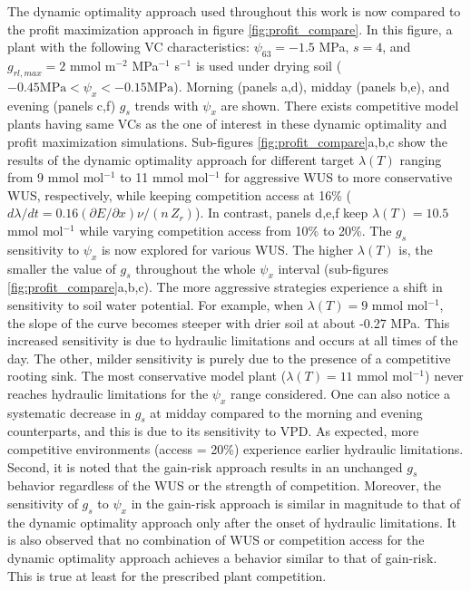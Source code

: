 \documentclass[utf8]{frontiersSCNS} %
\begin{document}
The dynamic optimality approach used throughout this work is now compared to the profit maximization approach in figure \ref{fig:profit_compare}. In this figure, a plant with the following VC characteristics: $\psi_{63} = -1.5$ MPa, $s=4$, and $g_{rl,max} = 2$ mmol m$^{-2}$ MPa$^{-1}$ s$^{-1}$ is used under drying soil ($-0.45 \text{MPa} < \psi_x < -0.15 \text{MPa}$). Morning (panels a,d), midday (panels b,e), and evening (panels c,f) $g_s$ trends with $\psi_x$ are shown. There exists competitive model plants having same VCs as the one of interest in these dynamic optimality and profit maximization simulations. Sub-figures \ref{fig:profit_compare}a,b,c show the results of the dynamic optimality approach for different target $\lambda(T)$ ranging from 9 mmol mol$^{-1}$ to 11 mmol mol$^{-1}$ for aggressive WUS to more conservative WUS, respectively, while keeping competition access at 16\% ($d\lambda/dt = 0.16 (\partial E / \partial x) \nu/(n\, Z_r) $). In contrast, panels d,e,f keep $\lambda(T)=10.5$ mmol mol$^{-1}$ while varying competition access from 10\% to 20\%.
The $g_s$ sensitivity to $\psi_x$ is now explored for various WUS. The higher $\lambda(T)$ is, the smaller the value of $g_s$ throughout the whole $\psi_x$ interval (sub-figures \ref{fig:profit_compare}a,b,c). The more aggressive strategies experience a shift in sensitivity to soil water potential. For example, when $\lambda(T)=9$ mmol mol$^{-1}$, the slope of the curve becomes steeper with drier soil at about -0.27 MPa. This increased sensitivity is due to hydraulic limitations and occurs at all times of the day. The other, milder sensitivity is purely due to the presence of a competitive rooting sink. The most conservative model plant ($\lambda(T) = 11$ mmol mol$^{-1}$) never reaches hydraulic limitations for the $\psi_x$ range considered. One can also notice a systematic decrease in $g_s$ at midday compared to the morning and evening counterparts, and this is due to its sensitivity to VPD.  As expected, more competitive environments (access = 20\%) experience earlier hydraulic limitations.
Second, it is noted that the gain-risk approach results in an unchanged $g_s$ behavior regardless of the WUS or the strength of competition. Moreover, the sensitivity of $g_s$ to $\psi_x$ in the gain-risk approach is similar in magnitude to that of the dynamic optimality approach only after the onset of hydraulic limitations. It is also observed that no combination of WUS or competition access for the dynamic optimality approach achieves a behavior similar to that of gain-risk. This is true at least for the prescribed plant competition. 
\end{document}
